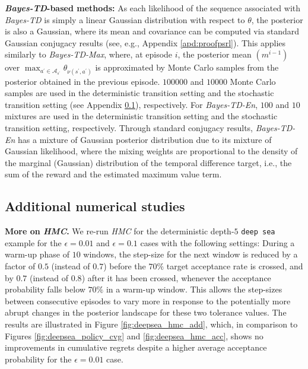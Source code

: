 \documentclass{amsart}
\begin{document}
\textbf{\textit{Bayes-TD}-based methods:} As each likelihood of the sequence associated with \textit{Bayes-TD} is simply a linear Gaussian distribution with respect to $\theta$, the posterior is also a Gaussian, where its mean and covariance can be computed via standard Gaussian conjugacy results (see, e.g., Appendix \ref{apd:proofpsrl}). This applies similarly to \textit{Bayes-TD-Max}, where, at episode $i$, the posterior mean $(m^{i-1})$ over $\max_{a^\prime \in \mathcal{A}_{s^\prime}} \theta_{\nu(s^\prime,a^\prime)}$ is approximated by Monte Carlo samples from the posterior obtained in the previous episode. $100000$ and $10000$ Monte Carlo samples are used in the deterministic transition setting and the stochastic transition setting (see Appendix \ref{apd:sec:additionalnumerial}), respectively. For \textit{Bayes-TD-En}, $100$ and $10$ mixtures are used in the deterministic transition setting and the stochastic transition setting, respectively. Through standard conjugacy results, \textit{Bayes-TD-En} has a mixture of Gaussian posterior distribution due to its mixture of Gaussian likelihood, where the mixing weights are proportional to the density of the marginal (Gaussian) distribution of the temporal difference target, i.e., the sum of the reward and the estimated maximum value term.



\subsection{Additional numerical studies}\label{apd:sec:additionalnumerial}

\textbf{More on \textit{HMC}.} We re-run \textit{HMC} for the deterministic depth-$5$ \texttt{deep sea} example for the $\epsilon=0.01$ and $\epsilon =0.1$ cases with the following settings: During a warm-up phase of $10$ windows, the step-size for the next window is reduced by a factor of $0.5$ (instead of $0.7$) before the $70\%$ target acceptance rate is crossed, and by $0.7$ (instead of $0.8$) after it has been crossed, whenever the acceptance probability falls below $70\%$ in a warm-up window. This allows the step-sizes between consecutive episodes to vary more in response to the potentially more abrupt changes in the posterior landscape for these two tolerance values. The results are illustrated in Figure \ref{fig:deepsea_hmc_add}, which, in comparison to Figures \ref{fig:deepsea_policy_cvg} and \ref{fig:deepsea_hmc_acc}, shows no improvements in cumulative regrets despite a higher average acceptance probability for the $\epsilon=0.01$ case.
\end{document}
